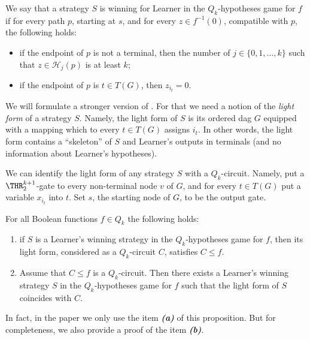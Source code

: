 We say that a strategy $S$ is winning for Learner in the $Q_k$-hypotheses game for $f$ if for every path $p$, starting at $s$, and for every $z\in f^{-1}(0)$, compatible with $p$, the following holds:
\begin{itemize}
\item if the endpoint of $p$ is not a terminal, then the number of $j\in\{0, 1, \ldots, k\}$ such that $z\in \mathcal{H}_j(p)$ is at least $k$;
\item if the endpoint of $p$ is $t\in T(G)$, then $z_{i_t} = 0$.
\end{itemize}
We will formulate a stronger version of . For that we need a notion of the \emph{light form} of a strategy $S$. Namely, the light form of $S$ is its ordered dag $G$ equipped with a mapping which to every $t\in T(G)$ assigns $i_t$. In other words, the light form contains a ``skeleton'' of $S$ and Learner's outputs in terminals (and no information about Learner's hypotheses). 

We can identify the light form of any strategy $S$ with a $Q_k$-circuit. Namely, put a $\THR^{k + 1}_2$-gate to every non-terminal node $v$ of $G$, and for every $t\in T(G)$ put a variable $x_{i_t}$ into $t$.
Set $s$, the starting node of $G$, to be %
the output gate. 

\begin{proposition}
\label{Q_k_equivalence}
For all Boolean functions $f\in Q_k$ the following holds:
\begin{enumerate}[label=(\alph*)]
\item if $S$ is a Learner's winning strategy in the $Q_k$-hypotheses game for $f$, then its light form, considered as a $Q_k$-circuit $C$, satisfies $C\le f$.


\item  Assume that $C\le f$ is a $Q_k$-circuit. Then there exists a Learner's winning strategy $S$ in the $Q_k$-hypotheses game for $f$ such that the light form of $S$ coincides with $C$.
\end{enumerate}
\end{proposition} 

In fact, in the paper  we only use the item \textbf{\emph{(a)}} of this proposition. But for completeness, we also provide a proof of the item \textbf{\emph{(b)}}.


